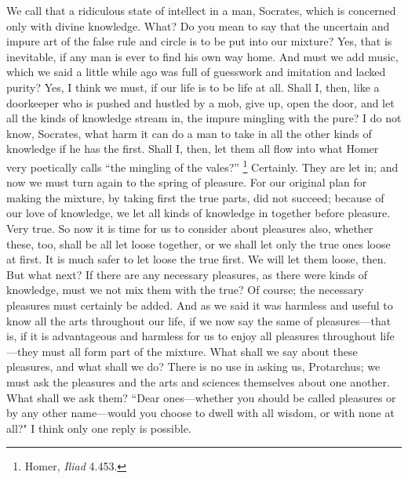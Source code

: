 \documentclass[letterpaper,12pt]{article}
\newcommand{\stephpag}[1]{\marginnote{\small\itshape\fontfamily{ppl}\selectfont #1}}
\begin{document}
\begin{drama}
\protarchusspeaks
We call that a ridiculous state of intellect in a man, Socrates, which is concerned only with divine knowledge.
\socratesspeaks
What? Do you mean to say that the uncertain and impure art of the false rule and circle is to be put into our mixture?
\protarchusspeaks
Yes, that is inevitable, if any man is ever to find his own way home.
\socratesspeaks
And must we add music, which we said a little while ago \stephpag{c} was full of guesswork and imitation and lacked purity?
\protarchusspeaks
Yes, I think we must, if our life is to be life at all.
\socratesspeaks
Shall I, then, like a doorkeeper who is pushed and hustled by a mob, give up, open the door, and let all the kinds of knowledge stream in, the impure mingling with the pure? \stephpag{d}
\protarchusspeaks
I do not know, Socrates, what harm it can do a man to take in all the other kinds of knowledge if he has the first.
\socratesspeaks
Shall I, then, let them all flow into what Homer very poetically calls ``the mingling of the vales?'' \footnote{Homer, \textit{Iliad} 4.453.}
\protarchusspeaks
Certainly.
\socratesspeaks
They are let in; and now we must turn again to the spring of pleasure. For our original plan for making the mixture, by taking first the true parts, did not succeed; because of our love of knowledge, \stephpag{e} we let all kinds of knowledge in together before pleasure.
\protarchusspeaks
Very true.
\socratesspeaks
So now it is time for us to consider about pleasures also, whether these, too, shall be all let loose together, or we shall let only the true ones loose at first.
\protarchusspeaks
It is much safer to let loose the true first.
\socratesspeaks
We will let them loose, then. But what next? If there are any necessary pleasures, as there were kinds of knowledge, must we not mix them with the true?
\protarchusspeaks
Of course; the necessary pleasures must certainly be added. \stephpag{63 a}
\socratesspeaks
And as we said it was harmless and useful to know all the arts throughout our life, if we now say the same of pleasures---that is, if it is advantageous and harmless for us to enjoy all pleasures throughout life---they must all form part of the mixture.
\protarchusspeaks
What shall we say about these pleasures, and what shall we do?
\socratesspeaks
There is no use in asking us, Protarchus; we must ask the pleasures and the arts and sciences themselves \stephpag{b} about one another.
\protarchusspeaks
What shall we ask them?
\socratesspeaks
``Dear ones---whether you should be called pleasures or by any other name---would you choose to dwell with all wisdom, or with none at all?" I think only one reply is possible.

\end{drama}
\end{document}
